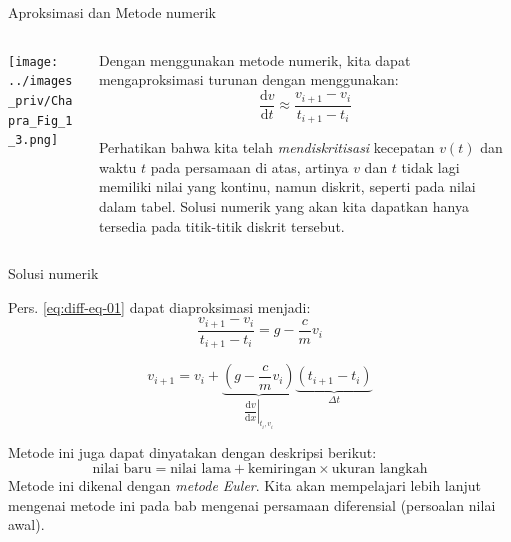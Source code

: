 \begin{frame}{Aproksimasi dan Metode numerik}

\begin{columns}[T]
\begin{column}{0.5\textwidth}
{\centering
\texttt{[image: ../images\_priv/Chapra\_Fig\_1\_3.png]}
\par}
\end{column}

\begin{column}{0.5\textwidth}
Dengan menggunakan metode numerik, kita dapat mengaproksimasi turunan
dengan menggunakan:
\begin{equation*}
\frac{\mathrm{d}v}{\mathrm{d}t} \approx \frac{v_{i+1} - v_{i}}{t_{i+1} - t_{i}}
\end{equation*}

Perhatikan bahwa kita telah \emph{mendiskritisasi} kecepatan \(v(t)\)
dan waktu \(t\) pada persamaan di atas, artinya \(v\) dan \(t\) tidak
lagi memiliki nilai yang kontinu, namun diskrit, seperti pada nilai
dalam tabel. Solusi numerik yang akan kita dapatkan hanya tersedia pada
titik-titik diskrit tersebut.
\end{column}
\end{columns}
\end{frame}




\begin{frame}{Solusi numerik}

\fontsize{9pt}{10pt}\selectfont

Pers. \eqref{eq:diff-eq-01} dapat
diaproksimasi menjadi:
\begin{equation*}
\frac{v_{i+1} - v_{i}}{t_{i+1} - t_{i}} = g - \frac{c}{m} v_{i}
\end{equation*}

\begin{equation*}
v_{i+1} = v_{i} + \underbrace{\left( g - \frac{c}{m} v_{i} \right)}_{
  \left.\dfrac{\mathrm{d}v}{\mathrm{d}x}\right|_{t_{i},v_{i}}
}
\underbrace{\left( t_{i+1} - t_{i} \right)}_{\Delta t}
\end{equation*}

Metode ini juga dapat dinyatakan dengan deskripsi berikut:
\begin{equation*}
\text{nilai baru} = \text{nilai lama} + \text{kemiringan}\times\text{ukuran langkah}
\end{equation*}
Metode ini dikenal dengan \emph{metode Euler}. Kita akan mempelajari
lebih lanjut mengenai metode ini pada bab mengenai persamaan diferensial
(persoalan nilai awal).
\end{frame}



